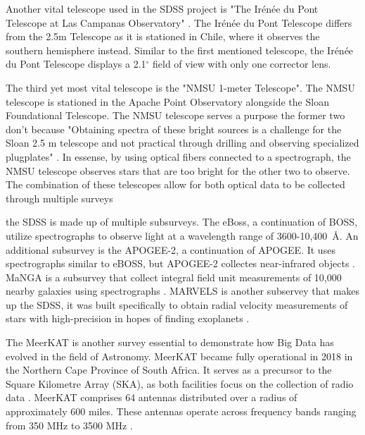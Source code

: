 \documentclass[preprint2,linenumbers, longauthor]{aastex631}
\begin{document}
Another vital telescope used in the SDSS project is "The Irénée du Pont Telescope at Las Campanas Observatory" . The Irénée du Pont Telescope differs from the 2.5m Telescope as it is stationed in Chile, where it observes the southern hemisphere instead. 
Similar to the first mentioned telescope, the Irénée du Pont Telescope displays a 2.1$^\circ$ field of view with only one corrector lens. \cite{bowenOpticalDesign40in1973}

The third yet most vital telescope is the "NMSU 1-meter Telescope". The NMSU telescope is stationed in the Apache Point Observatory alongside the Sloan Foundational Telescope. 
The NMSU telescope serves a purpose the former two don't because "Obtaining spectra of these bright sources is a challenge for the Sloan 2.5 m telescope and not practical through drilling and observing specialized plugplates" \cite{majewskiApachePointObservatory2017}. 
In essense, by using optical fibers connected to a spectrograph, the NMSU telescope observes stars that are too bright for the other two to observe. 
The combination of these telescopes allow for both optical data to be collected through multiple surveys \cite{holtzmanNMSU1Telescope2010}

the SDSS is made up of multiple subsurveys. The eBoss, a continuation of BOSS, utilize spectrographs to observe light at a wavelength range of 3600-10,400~\AA \cite{dawsonSDSSIVEXTENDEDBARYON2016}.
An additional subsurvey is the APOGEE-2, a continuation of APOGEE. It uses spectrographs similar to eBOSS, but APOGEE-2 collectes near-infrared objects \cite{majewskiApachePointObservatory2017}. 
MaNGA is a subsurvey that collect integral field unit measurements of 10,000 nearby galaxies using spectrographs \cite{bundyOVERVIEWSDSSIVMaNGA2014}.
MARVELS is another subservey that makes up the SDSS, it was built specifically to obtain radial velocity measurements of stars with high-precision in hopes of finding exoplanets \cite{bundyOVERVIEWSDSSIVMaNGA2014a}.


The MeerKAT is another survey essential to demonstrate how Big Data has evolved in the field of Astronomy.
MeerKAT became fully operational in 2018 in the Northern Cape Province of South Africa. It serves as a precursor to the Square Kilometre Array (SKA), as both facilities focus on the collection of radio data \cite{jonasMeerKATRadioTelescope2018}.
MeerKAT comprises 64 antennas distributed over a radius of approximately 600 miles. These antennas operate across frequency bands ranging from 350 MHz to 3500 MHz \cite{goedhartMeerKATSpecifications2025}.
\end{document}
